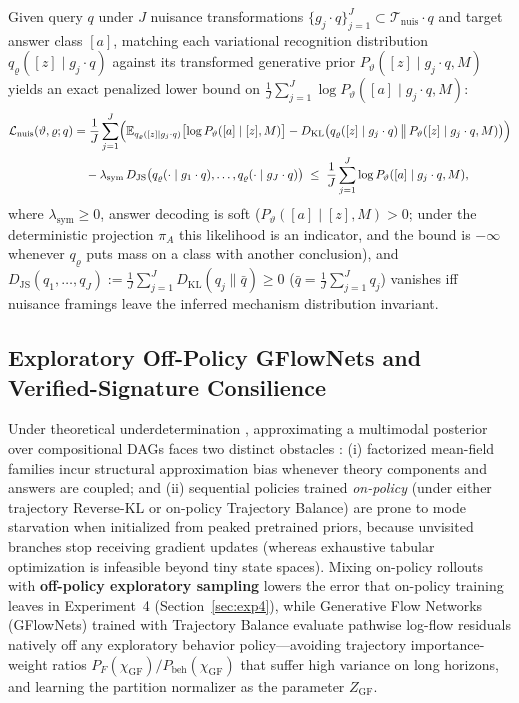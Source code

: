 \documentclass[11pt,a4paper]{article}
\theoremstyle{definition}
\theoremstyle{remark}
\newcommand{\E}{\mathbb{E}}
\newcommand{\KL}{D_{\mathrm{KL}}}
\newcommand{\JS}{D_{\mathrm{JS}}}
\begin{document}
Given query $q$ under $J$ nuisance transformations $\{g_j \cdot q\}_{j=1}^J \subset \mathcal{T}_{\mathrm{nuis}} \cdot q$ and target answer class $[a]$, matching each variational recognition distribution $q_\varrho([z] \mid g_j \cdot q)$ against its transformed generative prior $P_\vartheta([z] \mid g_j \cdot q, M)$ yields an exact penalized lower bound on $\frac{1}{J}\sum_{j=1}^J \log P_\vartheta([a] \mid g_j \cdot q, M)$:
\begin{align}
  \mathcal{L}_{\mathrm{nuis}}(\vartheta, \varrho; q)
  &= \frac{1}{J} \sum_{j=1}^J \Bigl(
      \E_{q_\varrho([z] \mid g_j \cdot q)} \bigl[ \log P_\vartheta([a] \mid [z], M) \bigr]
      - \KL\bigl( q_\varrho([z] \mid g_j \cdot q) \,\big\|\, P_\vartheta([z] \mid g_j \cdot q, M) \bigr)
    \Bigr) \nonumber\\
  &\quad - \lambda_{\mathrm{sym}} \, \JS\bigl( q_\varrho(\cdot \mid g_1 \cdot q), \dots, q_\varrho(\cdot \mid g_J \cdot q) \bigr)
  \;\le\; \frac{1}{J} \sum_{j=1}^J \log P_\vartheta([a] \mid g_j \cdot q, M),
  \label{eq:nuis_elbo}
\end{align}
where $\lambda_{\mathrm{sym}} \ge 0$, answer decoding is soft ($P_\vartheta([a] \mid [z], M) > 0$; under the deterministic projection $\pi_A$ this likelihood is an indicator, and the bound is $-\infty$ whenever $q_\varrho$ puts mass on a class with another conclusion), and $\JS(q_1, \dots, q_J) := \frac{1}{J} \sum_{j=1}^J \KL(q_j \| \bar{q}) \ge 0$ ($\bar{q} = \frac{1}{J}\sum_{j=1}^J q_j$) vanishes iff nuisance framings leave the inferred mechanism distribution invariant.

\subsection{\texorpdfstring{Exploratory Off-Policy GFlowNets and Verified-Signature Consilience}{Exploratory Off-Policy GFlowNets and Verified-Signature Consilience}}

Under theoretical underdetermination \cite{cartwright1983laws,nozick2001invariances}, approximating a multimodal posterior over compositional DAGs faces two distinct obstacles \cite{malkin2023gflownets}: (i) factorized mean-field families incur structural approximation bias whenever theory components and answers are coupled; and (ii) sequential policies trained \emph{on-policy} (under either trajectory Reverse-KL or on-policy Trajectory Balance) are prone to mode starvation when initialized from peaked pretrained priors, because unvisited branches stop receiving gradient updates (whereas exhaustive tabular optimization is infeasible beyond tiny state spaces). Mixing on-policy rollouts with \textbf{off-policy exploratory sampling} lowers the error that on-policy training leaves in Experiment~4 (Section~\ref{sec:exp4}), while Generative Flow Networks (GFlowNets) trained with Trajectory Balance \cite{malkin2022trajectory,malkin2023gflownets,deleu2022bayesian,hu2024amortizing,bengio2025scientist} evaluate pathwise log-flow residuals natively off any exploratory behavior policy---avoiding trajectory importance-weight ratios $P_F(\chi_{\mathrm{GF}})/P_{\mathrm{beh}}(\chi_{\mathrm{GF}})$ that suffer high variance on long horizons, and learning the partition normalizer as the parameter $Z_{\mathrm{GF}}$.
\end{document}
